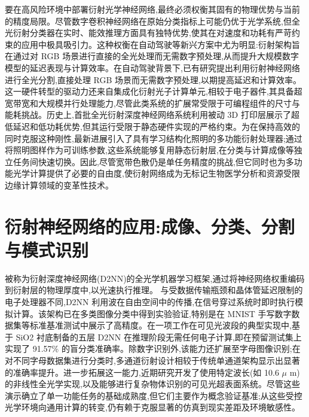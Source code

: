 \documentclass[11pt]{article}
\begin{document}
要在高风险环境中部署衍射光学神经网络,最终必须权衡其固有的物理优势与当前的精度局限。尽管数字卷积神经网络在原始分类指标上可能仍优于光学系统,但全光衍射分类器在实时、能效推理方面具有独特优势,使其在对速度和功耗有严苛约束的应用中极具吸引力。这种权衡在自动驾驶等新兴方案中尤为明显:衍射架构旨在通过对 RGB 场景进行直接的全光处理而无需数字预处理,从而提升大规模数字模型的延迟表现与计算效率。在自动驾驶背景下,已有研究提出利用衍射神经网络进行全光分割,直接处理 RGB 场景而无需数字预处理,以期提高延迟和计算效率。\citep{doi_10_48550_arxiv_2602_07717_16cb1c7a} 这一硬件转型的驱动力还来自集成化衍射光子计算单元,相较于电子器件,其具备超宽带宽和大规模并行处理能力,尽管此类系统的扩展常受限于可编程组件的尺寸与能耗挑战。历史上,首批全光衍射深度神经网络系统利用被动 3D 打印层展示了超低延迟和低功耗优势,但其运行受限于静态硬件实现的严格约束。为在保持高效的同时克服这种刚性,最新进展引入了具有学习结构化照明的多功能衍射处理器;通过将照明图样作为可训练参数,这些系统能够复用静态衍射层,在分类与计算成像等独立任务间快速切换。因此,尽管宽带色散仍是单任务精度的挑战,但它同时也为多功能光学计算提供了必要的自由度,使衍射网络成为无标记生物医学分析和资源受限边缘计算领域的变革性技术。\citep{doi_10_1364_ol_593231_ab93febc} \citep{doi_10_48550_arxiv_2602_07717_16cb1c7a} \citep{doi_10_1038_s41467_022_28702_0_1b79b43c} \citep{doi_10_1364_josab_497148_b087424b} \citep{doi_10_1364_ol_591818_8738c4b1}

\section{衍射神经网络的应用:成像、分类、分割与模式识别}\label{ux884dux5c04ux795eux7ecfux7f51ux7edcux7684ux5e94ux7528ux6210ux50cfux5206ux7c7bux5206ux5272ux4e0eux6a21ux5f0fux8bc6ux522b}

被称为衍射深度神经网络(D2NN)的全光学机器学习框架,通过将神经网络权重编码到衍射层的物理厚度中,以光速执行推理。\citep{doi_10_1021_acsphotonics_4c01284_s001_10346917} 与受数据传输瓶颈和晶体管延迟限制的电子处理器不同,D2NN 利用波在自由空间中的传播,在信号穿过系统时即时执行模拟计算。该架构已在多类图像分类中得到实验验证,特别是在 MNIST 手写数字数据集等标准基准测试中展示了高精度。在一项工作在可见光波段的典型实现中,基于 SiO2 衬底制备的五层 D2NN 在推理阶段无需任何电子计算,即在预留测试集上实现了 91.57\% 的盲分类准确率。除数字识别外,该能力还扩展至字母图像识别;在对不同字母数据集进行分类时,多通道衍射设计相较于传统单通道架构显示出显著的准确率提升。进一步拓展这一能力,近期研究开发了使用特定波长(如 10.6 \(\mu\) m)的非线性全光学实现,以及能够进行复杂物体识别的可见光超表面系统。尽管这些演示确立了单一功能任务的基础成熟度,但它们主要作为概念验证基准;从这些受控光学环境向通用计算的转变,仍有赖于克服显著的仿真到现实差距及环境敏感性。\citep{doi_10_54097_hset_v24i_3957_e6f20e8a} \citep{doi_10_1016_j_eng_2020_07_032_6e23cd05} \citep{doi_10_1155_2021_6667495_60f04b14} \citep{doi_10_1109_piers53385_2021_9694760_15b5fd61}
\end{document}
